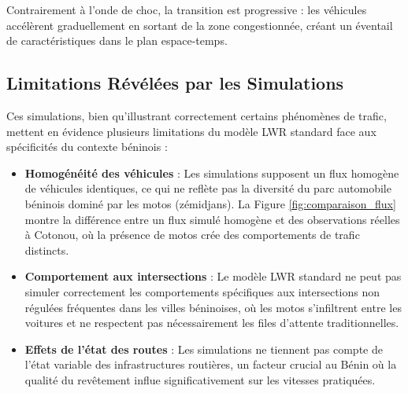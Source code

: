 Contrairement à l'onde de choc, la transition est progressive : les véhicules accélèrent graduellement en sortant de la zone congestionnée, créant un éventail de caractéristiques dans le plan espace-temps.

\subsection{Limitations Révélées par les Simulations}
\label{subsec:limitations_sim}

Ces simulations, bien qu'illustrant correctement certains phénomènes de trafic, mettent en évidence plusieurs limitations du modèle LWR standard face aux spécificités du contexte béninois :

\begin{itemize}
    \item \textbf{Homogénéité des véhicules} : Les simulations supposent un flux homogène de véhicules identiques, ce qui ne reflète pas la diversité du parc automobile béninois dominé par les motos (zémidjans). La Figure \ref{fig:comparaison_flux} montre la différence entre un flux simulé homogène et des observations réelles à Cotonou, où la présence de motos crée des comportements de trafic distincts.
    
    \item \textbf{Comportement aux intersections} : Le modèle LWR standard ne peut pas simuler correctement les comportements spécifiques aux intersections non régulées fréquentes dans les villes béninoises, où les motos s'infiltrent entre les voitures et ne respectent pas nécessairement les files d'attente traditionnelles.
    
    \item \textbf{Effets de l'état des routes} : Les simulations ne tiennent pas compte de l'état variable des infrastructures routières, un facteur crucial au Bénin où la qualité du revêtement influe significativement sur les vitesses pratiquées.
\end{itemize}



